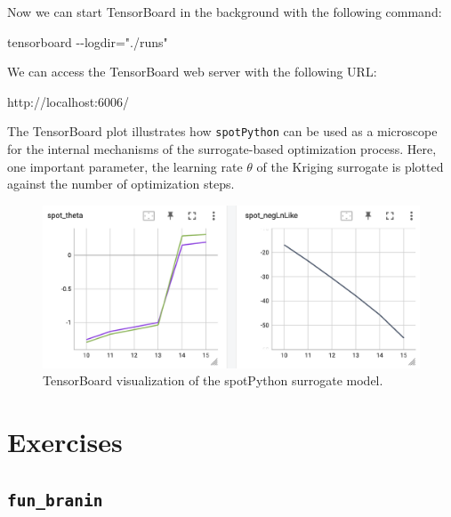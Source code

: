 \documentclass[
  letterpaper,
  DIV=11,
  numbers=noendperiod]{scrreprt}
\newenvironment{Shaded}{\begin{snugshade}}{\end{snugshade}}
\newcommand{\NormalTok}[1]{\textcolor[rgb]{0.00,0.23,0.31}{#1}}
\begin{document}
Now we can start TensorBoard in the background with the following
command:

\begin{Shaded}
\begin{Highlighting}[]
\NormalTok{tensorboard {-}{-}logdir="./runs"}
\end{Highlighting}
\end{Shaded}

We can access the TensorBoard web server with the following URL:

\begin{Shaded}
\begin{Highlighting}[]
\NormalTok{http://localhost:6006/}
\end{Highlighting}
\end{Shaded}

The TensorBoard plot illustrates how \texttt{spotPython} can be used as
a microscope for the internal mechanisms of the surrogate-based
optimization process. Here, one important parameter, the learning rate
\(\theta\) of the Kriging surrogate is plotted against the number of
optimization steps.

\begin{figure}

{\centering \includegraphics[width=1\textwidth,height=\textheight]{figures_static/03_tensorboard_03.png}

}

\caption{TensorBoard visualization of the spotPython surrogate model.}

\end{figure}

\hypertarget{exercises-3}{%
\section{Exercises}\label{exercises-3}}

\hypertarget{fun_branin}{%
\subsection{\texorpdfstring{\texttt{fun\_branin}}{fun\_branin}}\label{fun_branin}}
\end{document}
